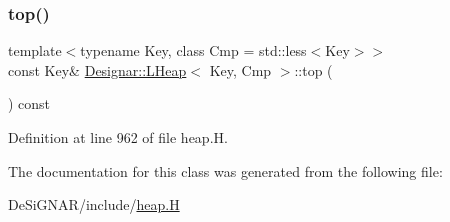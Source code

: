 \subsubsection{\texorpdfstring{top()}{top()}}
{\footnotesize\ttfamily template$<$typename Key, class Cmp = std\+::less$<$\+Key$>$$>$ \\
const Key\& \hyperlink{class_designar_1_1_l_heap}{Designar\+::\+L\+Heap}$<$ Key, Cmp $>$\+::top (\begin{DoxyParamCaption}{ }\end{DoxyParamCaption}) const\hspace{0.3cm}{\ttfamily [inline]}}



Definition at line 962 of file heap.\+H.



The documentation for this class was generated from the following file\+:\begin{DoxyCompactItemize}
\item 
De\+Si\+G\+N\+A\+R/include/\hyperlink{heap_8_h}{heap.\+H}\end{DoxyCompactItemize}
